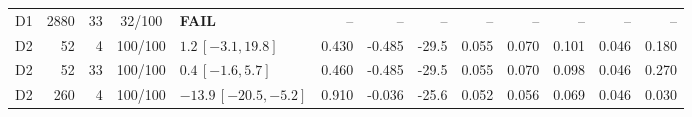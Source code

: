 \begin{longtable}{crrcp{33mm}rrrrrrrr}
D1 & 2880 & 33 & 32/100 & \textbf{FAIL} & -- & -- & -- & -- & -- & -- & -- & --\\
D2 & 52 & 4 & 100/100 & \(1.2\,[-3.1,19.8]\) & 0.430 & -0.485 & -29.5 & 0.055 & 0.070 & 0.101 & 0.046 & 0.180\\
D2 & 52 & 33 & 100/100 & \(0.4\,[-1.6,5.7]\) & 0.460 & -0.485 & -29.5 & 0.055 & 0.070 & 0.098 & 0.046 & 0.270\\
D2 & 260 & 4 & 100/100 & \(-13.9\,[-20.5,-5.2]\) & 0.910 & -0.036 & -25.6 & 0.052 & 0.056 & 0.069 & 0.046 & 0.030\\

\end{longtable}
